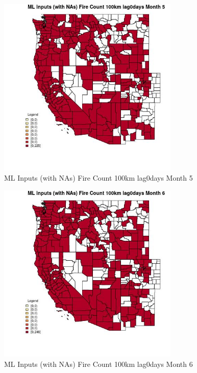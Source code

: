 \begin{figure} 
\centering  
\includegraphics[width=0.77\textwidth]{Code_Outputs/Report_ML_input_PM25_Step4_part_e_de_duplicated_aves_compiled_2019-05-20wNAs_CountyFire_Count_100km_lag0daysmedianMonth5.jpg} 
\caption{\label{fig:Report_ML_input_PM25_Step4_part_e_de_duplicated_aves_compiled_2019-05-20wNAsCountyFire_Count_100km_lag0daysmedianMonth5}ML Inputs (with NAs) Fire Count 100km lag0days Month 5} 
\end{figure} 
 

\begin{figure} 
\centering  
\includegraphics[width=0.77\textwidth]{Code_Outputs/Report_ML_input_PM25_Step4_part_e_de_duplicated_aves_compiled_2019-05-20wNAs_CountyFire_Count_100km_lag0daysmedianMonth6.jpg} 
\caption{\label{fig:Report_ML_input_PM25_Step4_part_e_de_duplicated_aves_compiled_2019-05-20wNAsCountyFire_Count_100km_lag0daysmedianMonth6}ML Inputs (with NAs) Fire Count 100km lag0days Month 6} 
\end{figure} 
 

